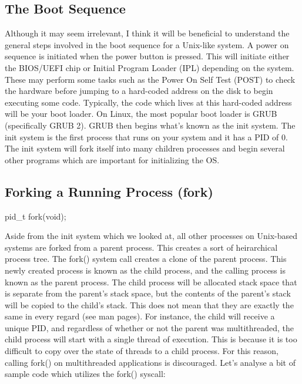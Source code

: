 \documentclass{article}
\begin{document}
\subsection{The Boot Sequence}

Although it may seem irrelevant, I think it will be beneficial to understand the general steps involved in
the boot sequence for a Unix-like system. A power on sequence is initiated when the power button is pressed.
This will initiate either the BIOS/UEFI chip or Initial Program Loader (IPL) depending on the system. These
may perform some tasks such as the Power On Self Test (POST) to check the hardware before jumping to a
hard-coded address on the disk to begin executing some code. Typically, the code which lives at this hard-coded
address will be your boot loader. On Linux, the most popular boot loader is GRUB (specifically GRUB 2). GRUB
then begins what's known as the init system. The init system is the first process that runs on your system and
it has a PID of 0. The init system will fork itself into many children processes and begin several other
programs which are important for initializing the OS.

\subsection{Forking a Running Process (fork)}

\begin{clst}

pid_t fork(void);

\end{clst}

Aside from the init system which we looked at, all other processes on Unix-based systems are forked from a
parent process. This creates a sort of heirarchical process tree. The fork() system call creates a clone of
the parent process. This newly created process is known as the child process, and the calling process is known
as the parent process. The child process will be allocated stack space that is separate from the parent's
stack space, but the contents of the parent's stack will be copied to the child's stack. This does not mean
that they are exactly the same in every regard (see man pages). For instance, the child will receive a unique
PID, and regardless of whether or not the parent was multithreaded, the child process will start with a single
thread of execution. This is because it is too difficult to copy over the state of threads to a child process.
For this reason, calling fork() on multithreaded applications is discouraged. Let's analyse a bit of sample
code which utilizes the fork() syscall:
\end{document}
